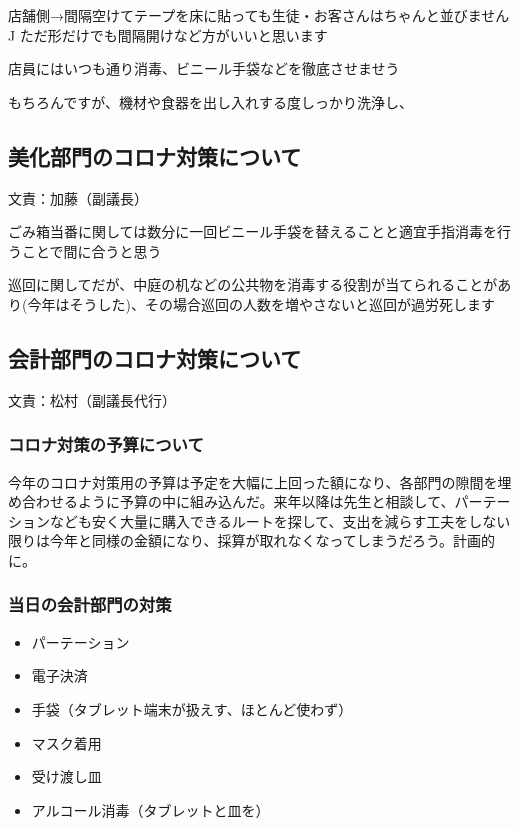 \documentclass[dvipdfmx,jb5]{jreport}
\begin{document}
店舗側→間隔空けてテープを床に貼っても生徒・お客さんはちゃんと並びません^^

ただ形だけでも間隔開けなど方がいいと思います

店員にはいつも通り消毒、ビニール手袋などを徹底させませう

もちろんですが、機材や食器を出し入れする度しっかり洗浄し、


\subsection{美化部門のコロナ対策について} 文責：加藤（副議長） \vspace{2mm}

ごみ箱当番に関しては数分に一回ビニール手袋を替えることと適宜手指消毒を行うことで間に合うと思う

巡回に関してだが、中庭の机などの公共物を消毒する役割が当てられることがあり(今年はそうした)、その場合巡回の人数を増やさないと巡回が過労死します

\subsection{会計部門のコロナ対策について} 文責：松村（副議長代行） \vspace{2mm}
\subsubsection{コロナ対策の予算について}
今年のコロナ対策用の予算は予定を大幅に上回った額になり、各部門の隙間を埋め合わせるように予算の中に組み込んだ。来年以降は先生と相談して、パーテーションなども安く大量に購入できるルートを探して、支出を減らす工夫をしない限りは今年と同様の金額になり、採算が取れなくなってしまうだろう。計画的に。

\subsubsection{当日の会計部門の対策}
\begin{itemize}
      \item パーテーション
      \item 電子決済
      \item 手袋（タブレット端末が扱えす、ほとんど使わず）
      \item マスク着用
      \item 受け渡し皿
      \item アルコール消毒（タブレットと皿を）
\end{itemize}
\end{document}
